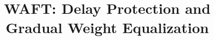 \documentclass[letterpaper,twocolumn,10pt]{article}
\begin{document}
\title{WAFT: Delay Protection and Gradual Weight Equalization}
\author{}\date{}
\maketitle

\end{document}
